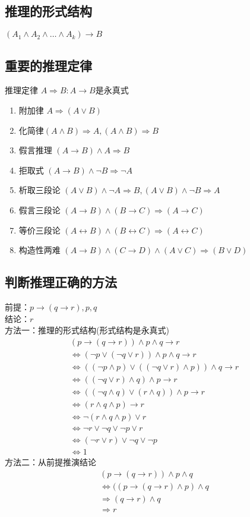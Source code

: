 \documentclass{book}
\newcommand{\Eqv}{\Leftrightarrow}
\newcommand{\eqv}{\leftrightarrow}
\newcommand{\To}{\Rightarrow}
\begin{document}
\subsection{推理的形式结构}
$(A_1\land A_2\land\dots\land A_k)\to B$
\subsection{重要的推理定律}
推理定律 $A\To B:A\to B$是永真式
\begin{enumerate}
\item 附加律 $A\To (A\lor B)$
\item 化简律$(A\land B)\To A, (A\land B)\To B$
\item 假言推理 $(A\to B)\land A\To B$
\item 拒取式 $(A\to B)\land \neg B\To \neg A$
\item 析取三段论 $(A\lor B)\land \neg A\To B, (A\lor B)\land \neg B\To A$
\item 假言三段论 $(A\to B)\land (B\to C)\To (A\to C)$
\item 等价三段论 $(A\eqv B)\land (B\eqv C)\To (A\eqv C)$
\item 构造性两难 $(A\to B)\land (C\to D)\land (A\lor C)\To (B\lor D)$
\end{enumerate}
\subsection{判断推理正确的方法}
前提：$p\to (q\to r), p, q$\\
结论：$r$\\
方法一：推理的形式结构(形式结构是永真式)\\
\begin{align*}
(p\to (q\to r))\land p \land q\to r\\
\Eqv (\neg p\lor (\neg q\lor r))\land p\land q\to r\\
\Eqv ((\neg p \land p)\lor ((\neg q\lor r)\land p))\land q\to r\\
\Eqv ((\neg q\lor r)\land q)\land p\to r\\
\Eqv ((\neg q\land q)\lor (r\land q))\land p\to r\\
\Eqv (r\land q\land p)\to r\\
\Eqv \neg (r\land q\land p)\lor r\\
\Eqv \neg r\lor \neg q\lor \neg p\lor r\\
\Eqv (\neg r\lor r)\lor \neg q\lor\neg p\\
\Eqv 1
\end{align*}
方法二：从前提推演结论\\
\begin{align*}
(p\to (q\to r))\land p\land q\\
\Eqv ((p\to (q\to r)\land p)\land q\\
\To (q\to r)\land q\\
\To r
\end{align*}
\end{document}
